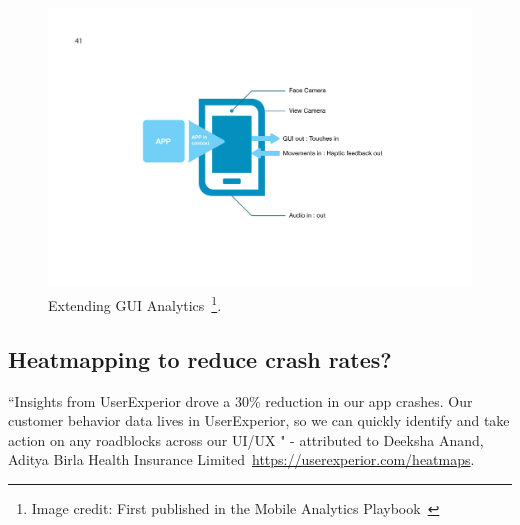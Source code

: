 \begin{figure}[htbp!]
    \begin{minipage}{\textwidth}
    \centering
    \includegraphics[width=15cm]{images/mobile-analytics-playbook/Chart-11-extending-gui-analytics.png}
    \caption[Extending GUI Analytics]{Extending GUI Analytics~\footnote{Image credit: First published in the Mobile Analytics Playbook~\cite{harty_aymer_playbook_2016}}.}
    \label{fig:extending-gui-analytics}
    \end{minipage}
\end{figure}

\subsection{Heatmapping to reduce crash rates?}
``Insights from UserExperior drove a 30\% reduction in our app crashes. Our customer behavior data lives in UserExperior, so we can quickly identify and take action on any roadblocks across our UI/UX " - attributed to Deeksha Anand, Aditya Birla Health Insurance Limited~\url{https://userexperior.com/heatmaps}. 

